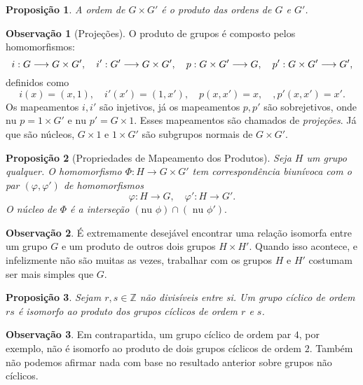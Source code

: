 \documentclass[a4paper,12pt]{report}
\theoremstyle{plain}
\newtheorem{proposicao}{Proposição}[section]
\theoremstyle{definition}
\newtheorem{observacao}{Observação}[section]
\begin{document}
\begin{proposicao}
	A ordem de \(G\times G'\) é o produto das ordens de
	\(G\) e \(G'\).	
\end{proposicao}

\begin{observacao}[Projeções]
	O produto de grupos é composto pelos homomorfismos:
	\[i: G\longrightarrow G\times G', \quad i': G'\longrightarrow G\times G', \newline \quad p: G\times G'\longrightarrow G, \quad p': G\times G'\longrightarrow G',\]
	definidos como
	\[i(x) = (x,1), \quad i'(x') = (1,x'), \quad p(x,x') = x, \quad, p'(x,x') = x'.\]
	Os mapeamentos \(i,i'\) são injetivos, já os mapeamentos \(p,p'\) são
	sobrejetivos, onde \(\text{nu }p = 1\times G'\) e
	\(\text{nu }p' = G\times 1\). Esses mapeamentos são chamados de
	\emph{projeções}. Já que são núcleos, \(G\times 1\) e \(1\times G'\)
	são subgrupos normais de \(G\times G'\).
\end{observacao}

\begin{proposicao}[Propriedades de Mapeamento dos Produtos]
	Seja
	\(H\) um grupo qualquer. O homomorfismo
	\(\Phi: H\longrightarrow G\times G'\) tem correspondência biunívoca com
	o par \((\varphi, \varphi')\) de homomorfismos
	\[\varphi:H\longrightarrow G, \quad \varphi': H\longrightarrow G'.\]
	O núcleo de \(\Phi\) é a interseção
	\((\text{nu }\phi)\cap(\text{ nu }\phi').\)	
\end{proposicao}

\begin{observacao}
	É extremamente desejável encontrar uma relação isomorfa entre um grupo
	\(G\) e um produto de outros dois grupos \(H\times H'\). Quando isso
	acontece, e infelizmente não são muitas as vezes, trabalhar com os
	grupos \(H\) e \(H'\) costumam ser mais simples que \(G\).
\end{observacao}

\begin{proposicao}
	Sejam \(r,s\in\mathbb{Z}\) não divisíveis entre si.
	Um grupo cíclico de ordem \(rs\) é isomorfo ao produto dos grupos
	cíclicos de ordem \(r\) e \(s\).	
\end{proposicao}

\begin{observacao}
	Em contrapartida, um grupo cíclico de ordem par \(4\), por exemplo, não
	é isomorfo ao produto de dois grupos cíclicos de ordem \(2\). Também não
	podemos afirmar nada com base no resultado anterior sobre grupos não
	cíclicos.
\end{observacao}
\end{document}
